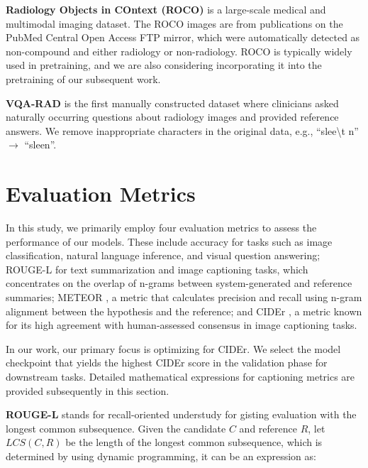 \documentclass[10pt]{article} \usepackage[preprint]{tmlr}
\begin{document}
\vspace{5pt}

\noindent \textbf{Radiology Objects in COntext (ROCO)} \citep{pelka2018radiology} is a large-scale medical and multimodal imaging dataset. The ROCO images are from publications on the PubMed Central Open Access FTP mirror, which were automatically detected as non-compound and either radiology or non-radiology. ROCO is typically widely used in pretraining, and we are also considering incorporating it into the pretraining of our subsequent work.
\vspace{5pt}

\noindent \textbf{VQA-RAD} \citep{lau2018dataset} is the first manually constructed dataset where clinicians asked naturally occurring questions about radiology images and provided reference answers. We remove inappropriate characters in the original data, e.g., ``slee\textbackslash t n'' $\rightarrow$ ``sleen''.
\vspace{5pt}

\section{Evaluation Metrics} \label{sec:eval_metic}
In this study, we primarily employ four evaluation metrics to assess the performance of our models. These include accuracy for tasks such as image classification, natural language inference, and visual question answering; ROUGE-L \citep{lin2004rouge} for text summarization and image captioning tasks, which concentrates on the overlap of n-grams between system-generated and reference summaries; METEOR \citep{banerjee2005meteor}, a metric that calculates precision and recall using n-gram alignment between the hypothesis and the reference; and CIDEr \citep{vedantam2015cider}, a metric known for its high agreement with human-assessed consensus in image captioning tasks.

In our work, our primary focus is optimizing for CIDEr. We select the model checkpoint that yields the highest CIDEr score in the validation phase for downstream tasks. Detailed mathematical expressions for captioning metrics are provided subsequently in this section.

\vspace{5pt}
\noindent \textbf{ROUGE-L} stands for recall-oriented understudy for gisting evaluation with the longest common subsequence. Given the candidate $C$ and reference $R$, let $LCS(C,R)$ be the length of the longest common subsequence, which is determined by using dynamic programming, it can be an expression as:
\end{document}
